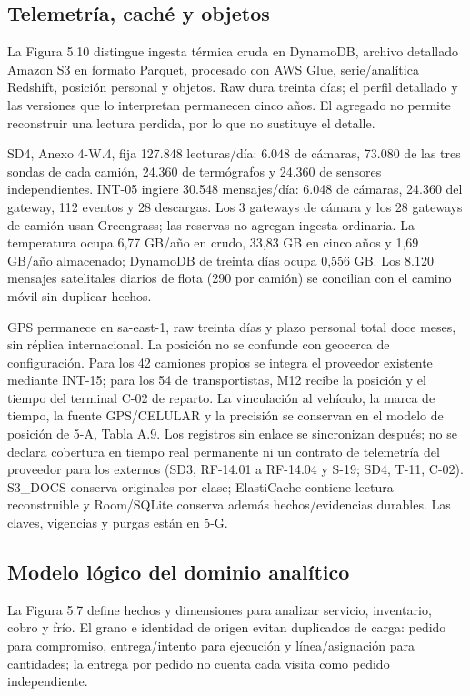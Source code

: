 \subsection{Telemetría, caché y objetos}
\label{sec:sd5-5-1-10}

La Figura 5.10 distingue ingesta térmica cruda en DynamoDB, archivo detallado Amazon S3 en formato Parquet, procesado con AWS Glue, serie/analítica Redshift, posición personal y objetos. Raw dura treinta días; el perfil detallado y las versiones que lo interpretan permanecen cinco años. El agregado no permite reconstruir una lectura perdida, por lo que no sustituye el detalle.

SD4, Anexo 4-W.4, fija 127.848 lecturas/día: 6.048 de cámaras, 73.080 de las tres sondas de cada camión, 24.360 de termógrafos y 24.360 de sensores independientes. INT-05 ingiere 30.548 mensajes/día: 6.048 de cámaras, 24.360 del gateway, 112 eventos y 28 descargas. Los 3 gateways de cámara y los 28 gateways de camión usan Greengrass; las reservas no agregan ingesta ordinaria. La temperatura ocupa 6,77 GB/año en crudo, 33,83 GB en cinco años y 1,69 GB/año almacenado; DynamoDB de treinta días ocupa 0,556 GB. Los 8.120 mensajes satelitales diarios de flota (290 por camión) se concilian con el camino móvil sin duplicar hechos.

GPS permanece en sa-east-1, raw treinta días y plazo personal total doce meses, sin réplica internacional. La posición no se confunde con geocerca de configuración. Para los 42 camiones propios se integra el proveedor existente mediante INT-15; para los 54 de transportistas, M12 recibe la posición y el tiempo del terminal C-02 de reparto. La vinculación al vehículo, la marca de tiempo, la fuente GPS/CELULAR y la precisión se conservan en el modelo de posición de 5-A, Tabla A.9. Los registros sin enlace se sincronizan después; no se declara cobertura en tiempo real permanente ni un contrato de telemetría del proveedor para los externos (SD3, RF-14.01 a RF-14.04 y S-19; SD4, T-11, C-02). S3\_DOCS conserva originales por clase; ElastiCache contiene lectura reconstruible y Room/SQLite conserva además hechos/evidencias durables. Las claves, vigencias y purgas están en 5-G.

\subsection{Modelo lógico del dominio analítico}
\label{sec:sd5-5-1-11}

La Figura 5.7 define hechos y dimensiones para analizar servicio, inventario, cobro y frío. El grano e identidad de origen evitan duplicados de carga: pedido para compromiso, entrega/intento para ejecución y línea/asignación para cantidades; la entrega por pedido no cuenta cada visita como pedido independiente.

